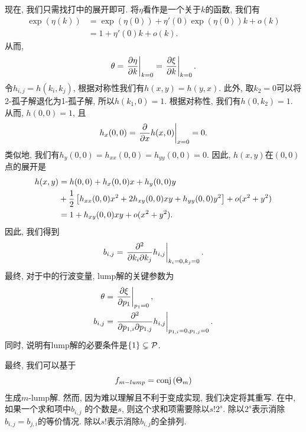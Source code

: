 现在, 我们只需找打中的展开即可. 将$\eta$看作是一个关于$k$的函数, 我们有  
\begin{equation}
\begin{split}
\exp(\eta(k))&=\exp(\eta(0))+\eta'(0)\exp(\eta(0))k+o(k)\\ 
&=1+\eta'(0)k+o(k). 
\end{split}
\end{equation}
从而, 
\begin{equation}
\theta=\left.{\frac{\partial \eta}{\partial k}}\right|_{k=0}=\left.{\frac{\partial \xi}{\partial k}}\right|_{k=0}.
\end{equation}
令$h_{i,j}=h(k_i,k_j)$, 根据对称性我们有$h(x,y)=h(y,x)$. 此外, 取$k_2=0$可以将2-孤子解退化为1-孤子解, 所以$h(k_1,0)=1$. 根据对称性, 我们有$h(0,k_2)=1$. 从而, $h(0,0)=1$, 且
\begin{equation}
    h_x(0,0)=\left.{\frac{\partial}{\partial x}h(x,0)}\right|_{x=0}=0.
\end{equation}
类似地, 我们有$h_y(0,0)=h_{xx}(0,0)=h_{yy}(0,0)=0$. 因此, $h(x,y)$在$(0,0)$点的展开是 
\begin{equation}
\begin{split}
h(x,y)&=h(0,0)+h_x(0,0)x+h_y(0,0)y \\ 
&+\frac{1}{2}\left[h_{xx}(0,0)x^2+2h_{xy}(0,0)xy+h_{yy}(0,0)y^2\right]+o(x^2+y^2) \\ 
&=1+h_{xy}(0,0)xy+o(x^2+y^2).
\end{split}
\end{equation}
因此, 我们得到
\begin{equation}
    b_{i,j}=\left.{\frac{\partial^2}{\partial k_i\partial k_j}h_{i,j}}\right|_{k_i=0,k_j=0}.
\end{equation}
最终, 对于中的行波变量, lump解的关键参数为
\begin{equation}
\begin{split}
    \theta &= \left.{\frac{\partial \xi}{\partial p_1}}\right|_{p_1=0}, \\
    b_{i,j}&= \left.{\frac{\partial^2}{\partial p_{1,i}\partial p_{1,j}}h_{i,j}}\right|_{p_{1,i}=0,p_{1,j}=0}.
\end{split} \label{p-lump}
\end{equation}
同时, 说明有lump解的必要条件是$\left\{1\right\}\subsetneq \mathcal{P}$.

最终, 我们可以基于
\begin{equation}
    f_{m-lump}={\rm conj}\left(\Theta_m\right)
\end{equation}
生成$m$-lump解. 然而, 因为难以理解且不利于变成实现, 我们决定将其重写. 在中, 如果一个求和项中$b_{i,j}$ 的个数是$s$, 则这个求和项需要除以$s!2^s$. 除以$2^s$表示消除$b_{i,j}=b_{j,i}$的等价情况. 除以$s!$表示消除$b_{i,j}$的全排列.  


